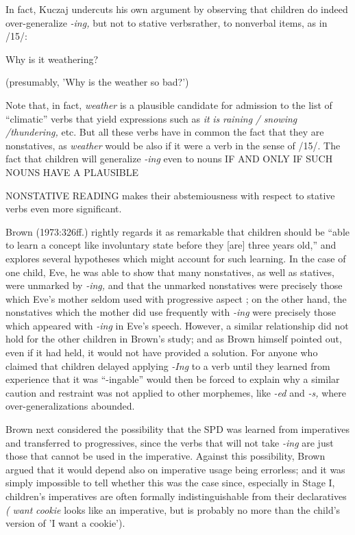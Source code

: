 In fact, Kuczaj undercuts his own argument by observing that children do indeed over-generalize \textit{{}-ing,} but not to stative verbs\-rather, to nonverbal items, as in /15/:

\ea\label{ex:15}
 Why is it weathering?
\glt
\z

(presumably, 'Why is the weather so bad?')


Note that, in fact, \textit{weather }is a plausible candidate for admission to the list of ``climatic'' verbs that yield expressions such as \textit{it} \textit{is} \textit{raining} \textit{/} \textit{snowing} \textit{/thundering, }etc. But all these verbs have in common the fact that they are nonstatives, as \textit{weather }would be also if it were a verb in the sense of /15/. The fact that children will generalize \textit{{}-ing} even to nouns IF AND ONLY IF SUCH NOUNS HAVE A PLAUSIBLE

NONSTATIVE READING makes their abstemiousness with respect to stative verbs even more significant.

Brown (1973:326ff.) rightly regards it as remarkable that chil\-dren should be ``able to learn a concept like involuntary state before they [are] three years old,'' and explores several hypotheses which might account for such learning. In the case of one child, Eve, he was able to show that many nonstatives, as well as statives, were unmarked by \textit{{}-ing,} and that the unmarked nonstatives were precisely those which Eve's mother seldom used with progressive aspect ; on the other hand, the nonstatives which the mother did use frequently with \textit{{}-ing} were precisely those which appeared with \textit{{}-ing }in Eve's speech. However, a similar relationship did not hold for the other children in Brown's study; and as Brown himself pointed out, even if it had held, it would not have provided a solution. For anyone who claimed that children delayed applying \textit{{}-I}\textit{n}\textit{g} to a verb until they learned from experience that it was ``{}-ingable'' would then be forced to explain why a similar caution and restraint was not applied to other morphemes, like \textit{{}-ed }and \textit{{}-s,} where over-generalizations abounded.

Brown next considered the possibility that the SPD was learned from imperatives and transferred to progressives, since the verbs that will not take \textit{{}-ing} are just those that cannot be used in the imperative. Against this possibility, Brown argued that it would depend also on imperative usage being errorless; and it was simply impossible to tell whether this was the case since, especially in Stage I, children's impera\-tives are often formally indistinguishable from their declaratives \textit{(} \textit{want} \textit{cookie} looks like an imperative, but is probably no more than the child's version of 'I want a cookie').

